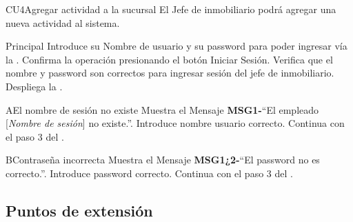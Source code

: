 
\begin{UseCase}{CU4}{Agregar actividad a la sucursal}{
		El Jefe de inmobiliario podrá agregar una nueva actividad al sistema.
	}
\end{UseCase}
\begin{UCtrayectoria}{Principal}
	\UCpaso[\UCactor] Introduce su Nombre de usuario y su password para poder ingresar vía la  \label{CU1LoginJI}.
	\UCpaso[\UCactor] Confirma la operación presionando el botón Iniciar Sesión.
	\UCpaso Verifica que el nombre y password son correctos para ingresar sesión del jefe de inmobiliario.
	\UCpaso Despliega la .
\end{UCtrayectoria}

\begin{UCtrayectoriaA}{A}{El nombre de sesión no existe}
	\UCpaso[\UCactor] Muestra el Mensaje {\bf MSG1-}``El empleado [{\em Nombre de sesión}] no existe.''.
	\UCpaso[\UCactor] Introduce nombre usuario correcto.
	\UCpaso[] Continua con el paso 3 del .
\end{UCtrayectoriaA}

\begin{UCtrayectoriaA}{B}{Contraseña incorrecta}
	\UCpaso Muestra el Mensaje {\bf MSG1¿2-}``El password no es correcto.''.
	\UCpaso[\UCactor] Introduce password correcto.
	\UCpaso[] Continua con el paso 3 del .
\end{UCtrayectoriaA}


\subsection{Puntos de extensión}
